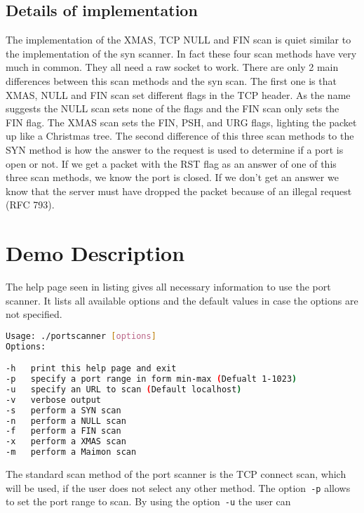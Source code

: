 \subsection{Details of implementation}
The implementation of the XMAS, TCP NULL and FIN scan is quiet similar to the implementation of the syn scanner. In fact these four scan methods have very much in common.
They all need a raw socket to work. There are only 2 main differences between this scan methods and the syn scan. The first one is that XMAS, NULL and FIN scan set different flags
in the TCP header. As the name suggests the NULL scan sets none of the flags and the FIN scan only sets the FIN flag. The XMAS scan sets the FIN, PSH, and URG flags, lighting the packet up like a Christmas tree.
The second difference of this three scan methods to the SYN method is how the answer to the request is used to determine if a port is open or not. If we get a packet with the RST flag as an answer of one
of this three scan methods, we know the port is closed. If we don't get an answer we know that the server must have dropped the packet because of an illegal request (RFC 793).

\section{Demo Description}
The help page seen in listing gives all necessary information to use the port scanner. It lists all available options and 
the default values in case the options are not specified.

\begin{lstlisting}[frame= single, language=bash, caption=Help page of port scanner]
Usage: ./portscanner [options]
Options:

-h 	 print this help page and exit
-p 	 specify a port range in form min-max (Defualt 1-1023)
-u 	 specify an URL to scan (Default localhost)
-v 	 verbose output
-s 	 perform a SYN scan
-n 	 perform a NULL scan
-f 	 perform a FIN scan
-x 	 perform a XMAS scan
-m 	 perform a Maimon scan
\end{lstlisting}

The standard scan method of the port scanner is the TCP connect scan, which will be used, if the user does not select any other method.
The option~\lstinline|-p| allows to set the port range to scan. By using the option~\lstinline|-u| the user can 

		
